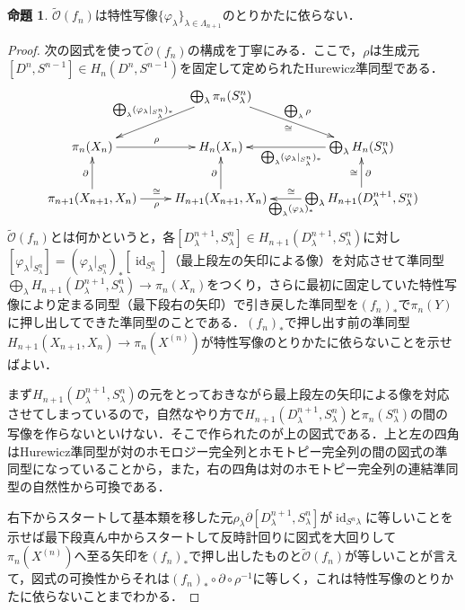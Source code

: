 \documentclass[a4paper,11pt]{jsarticle}
\theoremstyle{definition}
\newtheorem{prop}[thm]{命題}
\DeclareMathOperator{\id}{\mathrm{id}}
\begin{document}
\begin{prop}
  $\tilde{\mathcal{O}}(f_n)$は特性写像$\{\varphi_\lambda\}_{\lambda\in\Lambda_{n+1}}$のとりかたに依らない．
\end{prop}
\begin{proof}
  次の図式を使って$\tilde{\mathcal{O}}(f_n)$の構成を丁寧にみる．ここで，$\rho$は生成元$[D^n,S^{n-1}]\in H_n(D^n,S^{n-1})$を固定して定められたHurewicz準同型である．\[
  \xymatrix{
    &\bigoplus_\lambda\pi_n(S^n_\lambda)\ar[ld]_{\bigoplus_\lambda(\varphi_\lambda|_{S^n_\lambda})_*}\ar[rd]^{\bigoplus_\lambda\rho}_{\cong}&\\
    \pi_n(X_n)\ar[r]^\rho & 
    H_n(X_n)  & 
    \bigoplus_\lambda H_n(S^n_\lambda)\ar[l]^{\bigoplus_\lambda(\varphi_\lambda|_{S^n_\lambda})_*}\\
    \pi_{n+1}(X_{n+1},X_n)\ar[u]^{\partial}\ar[r]_\rho^{\cong} & 
    H_{n+1}(X_{n+1},X_n)\ar[u]^\partial & 
    \bigoplus_\lambda H_{n+1}(D^{n+1}_\lambda,S^n_\lambda)\ar[u]_\partial^\cong\ar[l]^{\bigoplus_\lambda (\varphi_\lambda)_*}_\cong
  }\]
  $\tilde{\mathcal{O}}(f_n)$とは何かというと，各$[D^{n+1}_\lambda,S^{n}_\lambda]\in H_{n+1}(D^{n+1}_\lambda,S^{n}_\lambda)$に対し$[\varphi_\lambda|_{S^n_\lambda}]=(\varphi_\lambda|_{S^n_\lambda})_*[\id_{S^n_\lambda}]$（最上段左の矢印による像）を対応させて準同型$\bigoplus_\lambda H_{n+1}(D^{n+1}_\lambda,S^n_\lambda)\to \pi_n(X_n)$をつくり，さらに最初に固定していた特性写像により定まる同型（最下段右の矢印）で引き戻した準同型を$(f_n)_*$で$\pi_n(Y)$に押し出してできた準同型のことである．$(f_n)_*$で押し出す前の準同型$H_{n+1}(X_{n+1},X_n)\to \pi_n(X^(n))$が特性写像のとりかたに依らないことを示せばよい．

  まず$H_{n+1}(D^{n+1}_\lambda,S^n_\lambda)$の元をとっておきながら最上段左の矢印による像を対応させてしまっているので，自然なやり方で$H_{n+1}(D^{n+1}_\lambda,S^n_\lambda)$と$\pi_n(S^n_\lambda)$の間の写像を作らないといけない．そこで作られたのが上の図式である．上と左の四角はHurewicz準同型が対のホモロジー完全列とホモトピー完全列の間の図式の準同型になっていることから，また，右の四角は対のホモトピー完全列の連結準同型の自然性から可換である．

  右下からスタートして基本類を移した元$\rho_\lambda\partial[D^{n+1}_\lambda,S^n_\lambda]$が$\id_{S^n\lambda}$に等しいことを示せば最下段真ん中からスタートして反時計回りに図式を大回りして$\pi_n(X^{(n)})$へ至る矢印を$(f_n)_*$で押し出したものと$\tilde{\mathcal{O}}(f_n)$が等しいことが言えて，図式の可換性からそれは$(f_n)_*\circ\partial\circ\rho^{-1}$に等しく，これは特性写像のとりかたに依らないことまでわかる．
\end{proof}
\end{document}
